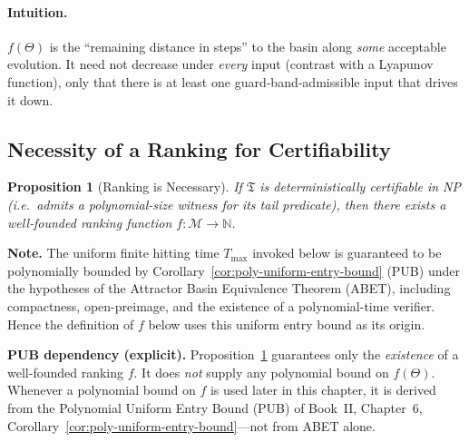 \documentclass[12pt]{article}
\theoremstyle{definition}
\theoremstyle{plain}
\newtheorem{proposition}{Proposition}[section]
\begin{document}
\paragraph{Intuition.}  
$f(\Theta)$ is the “remaining distance in steps” to the basin along \emph{some} acceptable evolution.  It need not decrease under \emph{every} input (contrast with a Lyapunov function), only that there is at least one guard‑band‑admissible input that drives it down.

\subsection{Necessity of a Ranking for Certifiability}
\label{subsec:ranking-necessary}

\begin{proposition}[Ranking is Necessary]
\label{prop:ranking-necessary-again}
If $\mathfrak T$ is deterministically certifiable in NP (i.e.\ admits a polynomial‑size witness for its tail predicate), then there exists a well‑founded ranking function $f:\mathcal M\to\mathbb N$.
\end{proposition}

\noindent\textbf{Note.}  
The uniform finite hitting time \(T_{\max}\) invoked below is guaranteed to be polynomially bounded by Corollary~\ref{cor:poly-uniform-entry-bound} (PUB) under the hypotheses of the Attractor Basin Equivalence Theorem (ABET), including compactness, open-preimage, and the existence of a polynomial-time verifier. Hence the definition of \(f\) below uses this uniform entry bound as its origin.

\noindent\textbf{PUB dependency (explicit).}
Proposition~\ref{prop:ranking-necessary-again} guarantees only the \emph{existence} of a well-founded ranking \(f\).
It does \emph{not} supply any polynomial bound on \(f(\Theta)\).
Whenever a polynomial bound on \(f\) is used later in this chapter, it is derived from the Polynomial Uniform Entry Bound (PUB) of Book~II, Chapter~6, Corollary~\ref{cor:poly-uniform-entry-bound}—not from ABET alone.
\end{document}

